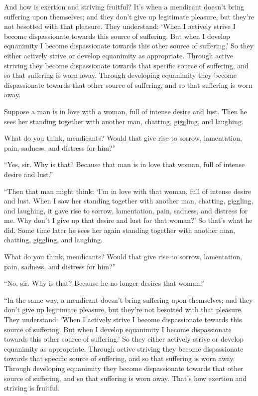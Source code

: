 \documentclass[12pt,openany]{book}%
\begin{document}
And how is exertion and striving fruitful? It’s when a mendicant doesn’t bring suffering upon themselves; and they don’t give up legitimate pleasure, but they’re not besotted with that pleasure. They understand: ‘When I actively strive I become dispassionate towards this source of suffering. But when I develop equanimity I become dispassionate towards this other source of suffering.’ So they either actively strive or develop equanimity as appropriate. Through active striving they become dispassionate towards that specific source of suffering, and so that suffering is worn away. Through developing equanimity they become dispassionate towards that other source of suffering, and so that suffering is worn away. 

Suppose a man is in love with a woman, full of intense desire and lust. Then he sees her standing together with another man, chatting, giggling, and laughing. 

What do you think, mendicants? Would that give rise to sorrow, lamentation, pain, sadness, and distress for him?” 

“Yes, sir. Why is that? Because that man is in love that woman, full of intense desire and lust.” 

“Then that man might think: ‘I’m in love with that woman, full of intense desire and lust. When I saw her standing together with another man, chatting, giggling, and laughing, it gave rise to sorrow, lamentation, pain, sadness, and distress for me. Why don’t I give up that desire and lust for that woman?’ So that’s what he did. Some time later he sees her again standing together with another man, chatting, giggling, and laughing. 

What do you think, mendicants? Would that give rise to sorrow, lamentation, pain, sadness, and distress for him?” 

“No, sir. Why is that? Because he no longer desires that woman.” 

“In the same way, a mendicant doesn’t bring suffering upon themselves; and they don’t give up legitimate pleasure, but they’re not besotted with that pleasure. They understand: ‘When I actively strive I become dispassionate towards this source of suffering. But when I develop equanimity I become dispassionate towards this other source of suffering.’ So they either actively strive or develop equanimity as appropriate. Through active striving they become dispassionate towards that specific source of suffering, and so that suffering is worn away. Through developing equanimity they become dispassionate towards that other source of suffering, and so that suffering is worn away. That’s how exertion and striving is fruitful. 
\end{document}
